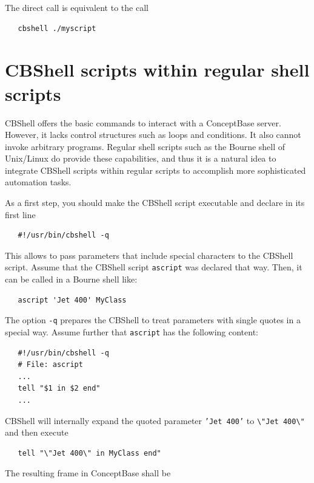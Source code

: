 The direct call is equivalent to the call

\begin{verbatim}
   cbshell ./myscript
\end{verbatim}
 

\section{CBShell scripts within regular shell scripts}
\label{sec:shellintegration}

CBShell offers the basic commands to interact with a ConceptBase
server. However, it lacks control structures such as loops and
conditions. It also cannot invoke arbitrary programs.
Regular shell scripts such as the Bourne shell of Unix/Linux 
do provide these capabilities, and thus it is a natural idea to
integrate CBShell scripts within regular scripts to accomplish more
sophisticated automation tasks.

As a first step, you should make the CBShell script executable and declare in its first line

\begin{verbatim}
   #!/usr/bin/cbshell -q
\end{verbatim}

This allows to pass parameters that include special characters
to the CBShell script. Assume  that the CBShell script {\tt ascript} was
declared that way. Then, it can be called in a Bourne shell like:

\begin{verbatim}
   ascript 'Jet 400' MyClass 
\end{verbatim}

The option {\tt -q}  prepares the CBShell to treat parameters with single quotes
in a special way. Assume further that {\tt ascript} has the following content:

\begin{verbatim}
   #!/usr/bin/cbshell -q
   # File: ascript
   ...
   tell "$1 in $2 end"
   ...
\end{verbatim}

CBShell will internally expand the quoted parameter {\tt 'Jet 400'} to
{\tt \textbackslash"Jet 400\textbackslash"} and then execute

\begin{verbatim}
   tell "\"Jet 400\" in MyClass end"
\end{verbatim}

The resulting frame in ConceptBase shall be

